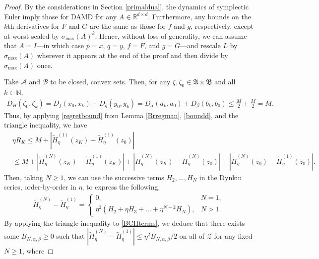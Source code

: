 \documentclass[11pt]{article}
\newcommand{\R}{\mathbb{R}}
\newcommand{\Z}{\mathcal{Z}}
\newcommand{\N}{\mathbb{N}}
\begin{document}
\begin{proof}
    By the considerations in Section \ref{primaldual}, the dynamics of symplectic Euler imply those for DAMD for any $A\in\R^{d\times d}$. Furthermore, any bounds on the $k$th derivatives for $F$ and $G$ are the same as those for $f$ and $g$, respectively, except at worst scaled by $\sigma_{\max}\left(A\right)^{k}$. Hence, without loss of generality, we can assume that $A=I$---in which case $p=x$, $q=y$, $f=F$, and $g=G$---and rescale $L$ by $\sigma_{\max}\left(A\right)$ wherever it appears at the end of the proof and then divide by $\sigma_{\max}\left(A\right)$ once.
    
    Take $\mathcal{A}$ and $\mathcal{B}$ to be closed, convex sets. Then, for any $\zeta,\zeta_{0}\in\mathfrak{A}\times\mathfrak{B}$ and all $k\in\N$,
\begin{gather}
    D_{H}\left(\zeta_{0},\zeta_k\right)=D_{f}\left(x_{0},x_k\right)+D_{g}\left(y_{0},y_k\right)=D_{\alpha}\left(a_k,a_{0}\right)+D_{\beta}\left(b_k,b_{0}\right)\leq \frac{M}{2}+\frac{M}{2}=M.\label{boundd}
\end{gather}
Thus, by applying \eqref{regretbound} from Lemma \ref{Brregman}, \eqref{boundd}, and the triangle inequality, we have
\begin{align}
    &\eta R_{K}\leq M+\left|\widetilde{H}_{\eta}^{(1)}\left(z_{K}\right)-\widetilde{H}_{\eta}^{(1)}\left(z_{0}\right)\right|\nonumber\\
    &\leq M+\left|\widetilde{H}_{\eta}^{(N)}\left(z_{K}\right)-\widetilde{H}_{\eta}^{(1)}\left(z_{K}\right)\right|+\left|\widetilde{H}_{\eta}^{(N)}\left(z_{K}\right)-\widetilde{H}_{\eta}^{(N)}\left(z_{0}\right)\right|+\left|\widetilde{H}_{\eta}^{(N)}\left(z_{0}\right)-\widetilde{H}_{\eta}^{(1)}\left(z_{0}\right)\right|.\label{huge}
\end{align}
Then, taking $N\geq 1$, we can use the successive terms $H_{2},\dots,H_{N}$ in the Dynkin series, order-by-order in $\eta$, to express the following:
\begin{gather}
    \widetilde{H}_{\eta}^{(N)}-\widetilde{H}_{\eta}^{(1)}=
    \begin{cases}
        0, & N=1,\\
        \eta^{2}\left(H_{2}+\eta H_{3}+\dots+\eta^{N-2}H_{N}\right), & N>1.
    \end{cases} \label{BCHterms}
\end{gather}
By applying the triangle inequality to \eqref{BCHterms}, we deduce that there exists some $B_{N,\alpha,\beta}\geq 0$ such that $\left|\widetilde{H}_{\eta}^{(N)}-\widetilde{H}_{\eta}^{(1)}\right|\leq\eta^{2}B_{N,\alpha,\beta}/2$ on all of $\Z$ for any fixed $N\geq 1$, where 

\end{proof}
\end{document}
